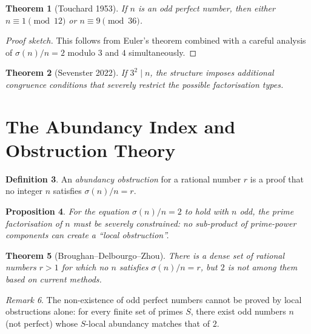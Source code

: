 \documentclass[12pt,a4paper]{amsart}
\newtheorem{theorem}{Theorem}[section]
\newtheorem{proposition}[theorem]{Proposition}
\theoremstyle{definition}
\newtheorem{definition}[theorem]{Definition}
\theoremstyle{remark}
\newtheorem{remark}[theorem]{Remark}
\begin{document}
\begin{theorem}[Touchard 1953]
\label{thm:touchard}
If $n$ is an odd perfect number, then either
$n \equiv 1 \pmod{12}$ or $n \equiv 9 \pmod{36}$.
\end{theorem}

\begin{proof}[Proof sketch]
This follows from Euler's theorem combined with a careful analysis of
$\sigma(n)/n = 2$ modulo $3$ and $4$ simultaneously.
\end{proof}

\begin{theorem}[Sevenster 2022]
If $3^2 \mid n$, the structure imposes additional congruence conditions
that severely restrict the possible factorisation types.
\end{theorem}

\section{The Abundancy Index and Obstruction Theory}

\begin{definition}
An \emph{abundancy obstruction} for a rational number $r$ is a proof that
no integer $n$ satisfies $\sigma(n)/n = r$.
\end{definition}

\begin{proposition}
For the equation $\sigma(n)/n = 2$ to hold with $n$ odd, the prime
factorisation of $n$ must be severely constrained: no sub-product of
prime-power components can create a ``local obstruction''.
\end{proposition}

\begin{theorem}[Broughan--Delbourgo--Zhou]
There is a dense set of rational numbers $r > 1$ for which no $n$ satisfies
$\sigma(n)/n = r$, but $2$ is \emph{not} among them based on current methods.
\end{theorem}

\begin{remark}
The non-existence of odd perfect numbers cannot be proved by local obstructions
alone: for every finite set of primes $S$, there exist odd numbers $n$ (not
perfect) whose $S$-local abundancy matches that of $2$.
\end{remark}

\end{document}
